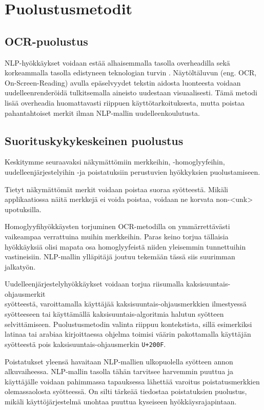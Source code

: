 \chapter{Puolustusmetodit\label{results}}
\section{OCR-puolustus}
NLP-hyökkäykset voidaan estää alhaisemmalla tasolla overheadilla sekä korkeammalla tasolla edistyneen teknologian turvin \citep{boucher2021bad}. Näytöltäluvun (eng. OCR, On-Screen-Reading) avulla epäselvyydet tekstin aidosta luonteesta voidaan uudelleenrenderöidä tulkitsemalla aineisto uudestaan visuaalisesti. Tämä metodi lisää overheadia huomattavasti riippuen käyttötarkoituksesta, mutta poistaa pahantahtoiset merkit ilman NLP-mallin uudelleenkoulutusta.

\section{Suorituskykykeskeinen puolustus}
Keskitymme seuraavaksi näkymättömiin merkkeihin, -homoglyyfeihin, \-uudelleenjärjestelyihin -ja poistatuksiin perustuvien hyökkyksien puolustamiseen.

Tietyt näkymättömät merkit voidaan poistaa suoraa syötteestä. Mikäli applikaatiossa näitä merkkejä ei voida poistaa, voidaan ne korvata non-<unk> upotuksilla.

Homoglyyfihyökkäysten torjuminen OCR-metodilla on ymmärrettävästi vaikeampaa verrattuina muihin merkkeihin. Paras keino torjua tällaisia hyökkäyksiä olisi mapata osa homoglyyfeistä niiden yleisemmin tunnettuihin vastineisiin. NLP-mallin ylläpitäjä joutuu tekemään tässä siis suurimman jalkatyön.

Uudelleenjärjestelyhyökkäykset voidaan torjua riisumalla kaksisuuntais-ohjausmerkit\\syötteestä, varoittamalla käyttäjää kaksisuuntais-ohjausmerkkien ilmestyessä syötteeseen tai käyttämällä kaksisuuntais-algoritmia halutun syötteen selvittämiseen. Puolustusmetodin valinta riippuu kontekstista, sillä esimerkiksi latinaa tai arabiaa kirjoittaessa ohjelma toimisi väärin pakottamalla käyttäjän syötteestä pois kaksisuuntais-ohjausmerkin \texttt{U+200F}.

Poistatukset yleensä havaitaan NLP-mallien ulkopuolella syötteen annon alkuvaiheessa. NLP-mallin tasolla tähän tarvitsee harvemmin puuttua ja käyttäjälle voidaan pahimmassa tapauksessa lähettää varoitus poistatusmerkkien olemassaolosta syötteessä. On silti tärkeää tiedostaa poistatuksien puolustus, mikäli käyttöjärjestelmä unohtaa puuttua kyseiseen hyökkäysrajapintaan.